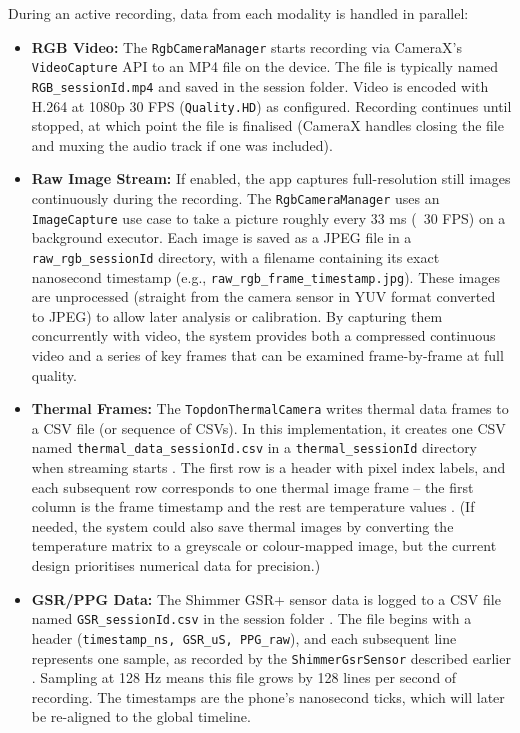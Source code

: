 During an active recording, data from each modality is handled in parallel:
\begin{itemize}
	\item \textbf{RGB Video:} The \texttt{RgbCameraManager} starts recording via CameraX's \texttt{VideoCapture} API to an MP4 file on the device. The file is typically named \texttt{RGB\_\<sessionId\>.mp4} and saved in the session folder. Video is encoded with H.264 at 1080p 30 FPS (\texttt{Quality.HD}) as configured. Recording continues until stopped, at which point the file is finalised (CameraX handles closing the file and muxing the audio track if one was included).
	\item \textbf{Raw Image Stream:} If enabled, the app captures full-resolution still images continuously during the recording. The \texttt{RgbCameraManager} uses an \texttt{ImageCapture} use case to take a picture roughly every 33 ms (~30 FPS) on a background executor. Each image is saved as a JPEG file in a \texttt{raw\_rgb\_\<sessionId\>} directory, with a filename containing its exact nanosecond timestamp (e.g., \texttt{raw\_rgb\_frame\_\<timestamp\>.jpg}). These images are unprocessed (straight from the camera sensor in YUV format converted to JPEG) to allow later analysis or calibration. By capturing them concurrently with video, the system provides both a compressed continuous video and a series of key frames that can be examined frame-by-frame at full quality.
	\item \textbf{Thermal Frames:} The \texttt{TopdonThermalCamera} writes thermal data frames to a CSV file (or sequence of CSVs). In this implementation, it creates one CSV named \texttt{thermal\_data\_\<sessionId\>.csv} in a \texttt{thermal\_\<sessionId\>} directory when streaming starts \cite{ref16}. The first row is a header with pixel index labels, and each subsequent row corresponds to one thermal image frame -- the first column is the frame timestamp and the rest are temperature values \cite{ref16}. (If needed, the system could also save thermal images by converting the temperature matrix to a greyscale or colour-mapped image, but the current design prioritises numerical data for precision.)
	\item \textbf{GSR/PPG Data:} The Shimmer GSR+ sensor data is logged to a CSV file named \texttt{GSR\_\<sessionId\>.csv} in the session folder \cite{ref15}. The file begins with a header (\texttt{timestamp\_ns, GSR\_uS, PPG\_raw}), and each subsequent line represents one sample, as recorded by the \texttt{ShimmerGsrSensor} described earlier \cite{ref15}. Sampling at 128 Hz means this file grows by 128 lines per second of recording. The timestamps are the phone's nanosecond ticks, which will later be re-aligned to the global timeline.

\end{itemize}
